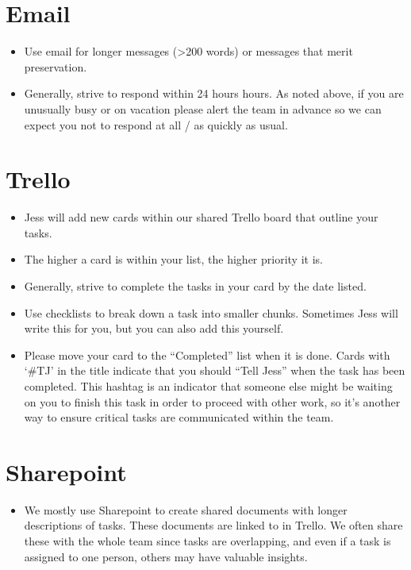\documentclass[
]{book}
\providecommand{\tightlist}{%
  \setlength{\itemsep}{0pt}\setlength{\parskip}{0pt}}
\begin{document}
\section{Email}\label{email}

\begin{itemize}
\tightlist
\item
  Use email for longer messages (\textgreater200 words) or messages that merit preservation.
\item
  Generally, strive to respond within 24 hours hours. As noted above, if you are unusually busy or on vacation please alert the team in advance so we can expect you not to respond at all / as quickly as usual.
\end{itemize}

\section{Trello}\label{trello}

\begin{itemize}
\tightlist
\item
  Jess will add new cards within our shared Trello board that outline your tasks.
\item
  The higher a card is within your list, the higher priority it is.
\item
  Generally, strive to complete the tasks in your card by the date listed.
\item
  Use checklists to break down a task into smaller chunks. Sometimes Jess will write this for you, but you can also add this yourself.
\item
  Please move your card to the ``Completed'' list when it is done. Cards with `\#TJ' in the title indicate that you should ``Tell Jess'' when the task has been completed. This hashtag is an indicator that someone else might be waiting on you to finish this task in order to proceed with other work, so it's another way to ensure critical tasks are communicated within the team.
\end{itemize}

\section{Sharepoint}\label{sharepoint}

\begin{itemize}
\tightlist
\item
  We mostly use Sharepoint to create shared documents with longer descriptions of tasks. These documents are linked to in Trello. We often share these with the whole team since tasks are overlapping, and even if a task is assigned to one person, others may have valuable insights.
\end{itemize}
\end{document}
